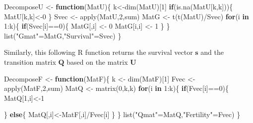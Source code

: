 \documentclass[
]{book}
\newenvironment{Shaded}{\begin{snugshade}}{\end{snugshade}}
\newcommand{\ControlFlowTok}[1]{\textcolor[rgb]{0.13,0.29,0.53}{\textbf{#1}}}
\newcommand{\DecValTok}[1]{\textcolor[rgb]{0.00,0.00,0.81}{#1}}
\newcommand{\FunctionTok}[1]{\textcolor[rgb]{0.00,0.00,0.00}{#1}}
\newcommand{\NormalTok}[1]{#1}
\newcommand{\OtherTok}[1]{\textcolor[rgb]{0.56,0.35,0.01}{#1}}
\newcommand{\SpecialCharTok}[1]{\textcolor[rgb]{0.00,0.00,0.00}{#1}}
\newcommand{\StringTok}[1]{\textcolor[rgb]{0.31,0.60,0.02}{#1}}
\begin{document}
\begin{Shaded}
\begin{Highlighting}[]
\NormalTok{DecomposeU }\OtherTok{\textless{}{-}} \ControlFlowTok{function}\NormalTok{(MatU)\{}
\NormalTok{  k}\OtherTok{\textless{}{-}}\FunctionTok{dim}\NormalTok{(MatU)[}\DecValTok{1}\NormalTok{]}
  \ControlFlowTok{if}\NormalTok{(}\FunctionTok{is.na}\NormalTok{(MatU[k,k]))\{}
\NormalTok{    MatU[k,k]}\OtherTok{\textless{}{-}}\DecValTok{0}
\NormalTok{  \}}
\NormalTok{  Svec }\OtherTok{\textless{}{-}} \FunctionTok{apply}\NormalTok{(MatU,}\DecValTok{2}\NormalTok{,sum)}
\NormalTok{  MatG }\OtherTok{\textless{}{-}} \FunctionTok{t}\NormalTok{(}\FunctionTok{t}\NormalTok{(MatU)}\SpecialCharTok{/}\NormalTok{Svec)}
  \ControlFlowTok{for}\NormalTok{(i }\ControlFlowTok{in} \DecValTok{1}\SpecialCharTok{:}\NormalTok{k)\{}
    \ControlFlowTok{if}\NormalTok{(Svec[i]}\SpecialCharTok{==}\DecValTok{0}\NormalTok{)\{}
\NormalTok{      MatG[,i] }\OtherTok{\textless{}{-}} \DecValTok{0}
\NormalTok{      MatG[i,i] }\OtherTok{\textless{}{-}} \DecValTok{1}
\NormalTok{    \}}
\NormalTok{  \}}
 \FunctionTok{list}\NormalTok{(}\StringTok{"Gmat"}\OtherTok{=}\NormalTok{MatG,}\StringTok{"Survival"}\OtherTok{=}\NormalTok{Svec)}
\NormalTok{\}}
\end{Highlighting}
\end{Shaded}

Similarly, this following R function returns the survival vector \(\mathbf{s}\) and the transition matrix \(\mathbf{Q}\) based on the matrix \(\mathbf{U}\)

\begin{Shaded}
\begin{Highlighting}[]
\NormalTok{DecomposeF }\OtherTok{\textless{}{-}} \ControlFlowTok{function}\NormalTok{(MatF)\{}
\NormalTok{    k }\OtherTok{\textless{}{-}} \FunctionTok{dim}\NormalTok{(MatF)[}\DecValTok{1}\NormalTok{]}
\NormalTok{    Fvec }\OtherTok{\textless{}{-}} \FunctionTok{apply}\NormalTok{(MatF,}\DecValTok{2}\NormalTok{,sum)}
\NormalTok{    MatQ }\OtherTok{\textless{}{-}} \FunctionTok{matrix}\NormalTok{(}\DecValTok{0}\NormalTok{,k,k)}
    \ControlFlowTok{for}\NormalTok{(i }\ControlFlowTok{in} \DecValTok{1}\SpecialCharTok{:}\NormalTok{k)\{}
        \ControlFlowTok{if}\NormalTok{(Fvec[i]}\SpecialCharTok{==}\DecValTok{0}\NormalTok{)\{}
\NormalTok{            MatQ[}\DecValTok{1}\NormalTok{,i]}\OtherTok{\textless{}{-}}\DecValTok{1}
            
\NormalTok{        \}}
        \ControlFlowTok{else}\NormalTok{\{}
\NormalTok{            MatQ[,i]}\OtherTok{\textless{}{-}}\NormalTok{MatF[,i]}\SpecialCharTok{/}\NormalTok{Fvec[i]}
\NormalTok{        \}}
\NormalTok{    \}}
 \FunctionTok{list}\NormalTok{(}\StringTok{"Qmat"}\OtherTok{=}\NormalTok{MatQ,}\StringTok{"Fertility"}\OtherTok{=}\NormalTok{Fvec)}
\NormalTok{\}}
\end{Highlighting}
\end{Shaded}
\end{document}
